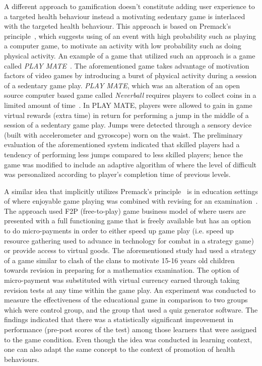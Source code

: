 A different approach to gamification doesn't constitute adding user experience to a targeted health behaviour instead a motivating sedentary game is interlaced with the targeted health behaviour. This approach is based on Premack's principle~\citep{premack1959toward}, which suggests using of an event with high probability such as playing a computer game, to motivate an activity with low probability such as doing physical activity. An example of a game that utilized such an approach is a game called \emph{PLAY MATE}~\citep{berkovsky2010physical,berkovsky2012physical}. The aforementioned game takes advantage of motivation factors of video games by introducing a burst of physical activity during a session of a sedentary game play. \emph{PLAY MATE}, which was an alteration of an open source computer based game called \emph{Neverball} requires players to collect coins in a limited amount of time~\citep{berkovsky2012physical}. In PLAY MATE, players were allowed to gain in game virtual rewards (extra time) in return for performing a jump in the middle of a session of a sedentary game play. Jumps were detected through a sensory device (built with accelerometer and gyroscope) worn on the waist. The preliminary evaluation of the aforementioned system indicated that skilled players had a tendency of performing less jumps compared to less skilled players; hence the game was modified to include an adaptive algorithm of where the level of difficult was personalized according to player's completion time of previous levels.

A similar idea that implicitly utilizes Premack's principle~\citep{premack1959toward} is in education settings of where enjoyable  game  playing was combined with revising for an examination~\citep{preist2015use}. The approach used F2P (free-to-play) game business model of where users are presented with a full functioning game that is freely available but has an option to do micro-payments in order to either speed up game play (i.e. speed up resource gathering used to advance in technology for combat in a strategy game) or provide access to virtual goods. The aforementioned study had used a strategy of a game similar to clash of the clans to motivate 15-16 years old children towards revision in preparing for a mathematics examination. The option of micro-payment was substituted with virtual currency earned through taking revision tests at any time within the game play. An experiment was conducted to measure the effectiveness of the educational game in comparison to two groups which were control group, and the group that used a quiz generator software. The findings indicated that there was a statistically significant improvement in performance (pre-post scores of the test) among those learners that were assigned to the game condition. Even though the idea was conducted in learning context, one can also adapt the same concept to the context of promotion of health behaviours.

